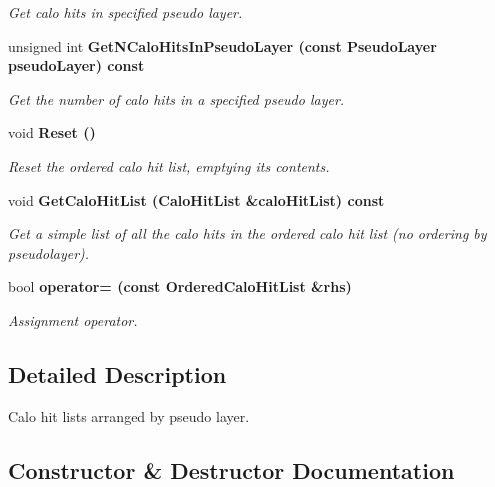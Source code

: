 \begin{CompactItemize}
\begin{CompactList}\small\item\em Get calo hits in specified pseudo layer. \item\end{CompactList}\item 
unsigned int \bf{Get\-NCalo\-Hits\-In\-Pseudo\-Layer} (const Pseudo\-Layer pseudo\-Layer) const 
\begin{CompactList}\small\item\em Get the number of calo hits in a specified pseudo layer. \item\end{CompactList}\item 
void \bf{Reset} ()\label{classpandora_1_1OrderedCaloHitList_cef533d9f0b1a8cbd4079876b3a01ff2}

\begin{CompactList}\small\item\em Reset the ordered calo hit list, emptying its contents. \item\end{CompactList}\item 
void \bf{Get\-Calo\-Hit\-List} (Calo\-Hit\-List \&calo\-Hit\-List) const 
\begin{CompactList}\small\item\em Get a simple list of all the calo hits in the ordered calo hit list (no ordering by pseudolayer). \item\end{CompactList}\item 
bool \bf{operator=} (const \bf{Ordered\-Calo\-Hit\-List} \&rhs)
\begin{CompactList}\small\item\em Assignment operator. \item\end{CompactList}\end{CompactItemize}


\subsection{Detailed Description}
Calo hit lists arranged by pseudo layer. 



\subsection{Constructor \& Destructor Documentation}
